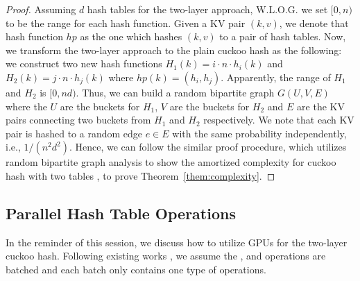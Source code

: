 \begin{proof}
Assuming $d$ hash tables for the two-layer approach, W.L.O.G. we set $[0,n)$ to be the range for each hash function. Given a KV pair $(k,v)$, we denote that hash function $hp$ as the one which hashes $(k,v)$ to a pair of hash tables.
Now, we transform the two-layer approach to the plain cuckoo hash as the following:
we construct two new hash functions $H_1(k) = i \cdot n \cdot h_i(k)$ and $H_2(k) = j \cdot n \cdot h_j(k)$ where $hp(k) = (h_i,h_j)$.
Apparently, the range of $H_1$ and $H_2$ is $[0,nd)$. Thus, we can build a random bipartite graph $G(U,V,E)$ where the $U$ are the buckets for $H_1$, $V$ are the buckets for $H_2$ and $E$ are the KV pairs connecting two buckets from $H_1$ and $H_2$ respectively. 
We note that each KV pair is hashed to a random edge $e \in E$ with the same probability independently, i.e., $1/(n^2d^2)$. Hence, we can follow the similar proof procedure, which utilizes random bipartite graph analysis to show the amortized complexity for cuckoo hash with two tables \cite{kutzelnigg:hal-01184689}, to prove Theorem~\ref{them:complexity}.
\end{proof}



\subsection{Parallel Hash Table Operations}\label{sec:vot:con}
In the reminder of this session, we discuss how to utilize GPUs for the two-layer cuckoo hash. Following existing works \cite{alcantara2009real,zhang2015mega,breslow2016horton}, we assume the ,  and  operations are batched and each batch only contains one type of operations. 

